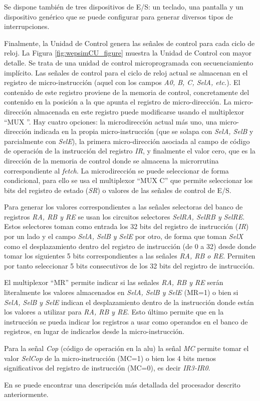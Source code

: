Se dispone también de tres dispositivos de E/S: un teclado, una pantalla y un dispositivo genérico que se puede configurar para generar diversos tipos de interrupciones.

Finalmente, la Unidad de Control genera las señales de control para cada ciclo de reloj. La Figura \ref{fig:wepsimCU_figure} muestra la Unidad de Control con mayor detalle. Se trata de una unidad de control microprogramada con secuenciamiento implícito. Las señales de control para el ciclo de reloj actual se almacenan en el registro de micro-instrucción (aquel con los campos \emph{A0, B, C, SelA, etc.}). El contenido de este registro proviene de la memoria de control, concretamente del contenido en la posición a la que apunta el registro de micro-dirección. La micro-dirección almacenada en este registro puede modificarse usando el multiplexor ``MUX ''. Hay cuatro opciones: la microdirección actual más uno, una micro-dirección indicada en la propia micro-instrucción (que se solapa con \emph{SelA, SelB} y parcialmente con \emph{SelE}), la primera micro-dirección asociada al campo de código de operación de la instrucción del registro \emph{IR}, y finalmente el valor cero, que es la dirección de la memoria de control donde se almacena la microrrutina correspondiente al \emph{fetch}. La microdirección se puede seleccionar de forma condicional, para ello se usa el multiplexor ``MUX C'' que permite seleccionar los bits del registro de estado (\emph{SR}) o valores de las señales de control de E/S.

Para generar los valores correspondientes a las señales selectoras del banco de registros \emph{RA, RB y RE} se usan los circuitos selectores \emph{SelRA, SelRB y SelRE}. Estos selectores toman como entrada los 32 bits del registro de instrucción (\emph{IR}) por un lado y el campo \emph{SelA, SelB y SelE} por otro, de forma que toman \emph{SelX} como el desplazamiento dentro del registro de instrucción (de 0 a 32) desde donde tomar los siguientes 5 bits correspondientes a las señales \emph{RA, RB o RE}. Permiten por tanto seleccionar 5 bits consecutivos de los 32 bits del registro de instrucción.

El multiplexor ``MR'' permite indicar si las señales \emph{RA, RB y RE} serán literalmente los valores almacenados en \emph{SelA, SelB y SelE} (MR=1) o bien si \emph{SelA, SelB y SelE} indican el desplazamiento dentro de la instrucción donde están los valores a utilizar para \emph{RA, RB y RE}. Esto último permite que en la instrucción se pueda indicar los registros a usar como operandos en el banco de registros, en lugar de indicarlos desde la micro-instrucción.

Para la señal \emph{Cop} (código de operación en la \acrshort{alu}) la señal \emph{MC} permite tomar el valor \emph{SelCop} de la micro-instrucción (MC=1) o bien los 4 bits menos significativos del registro de instrucción (MC=0), es decir \emph{IR3-IR0}.

En \cite{perez2015problemas} se puede encontrar una descripción más detallada del procesador descrito anteriormente.





